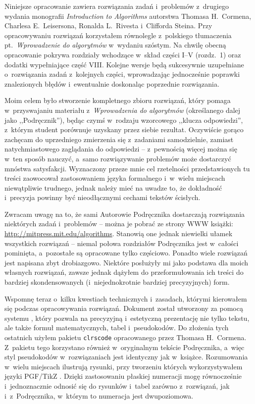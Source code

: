 
Niniejsze opracowanie zawiera rozwiązania zadań i~problemów z~drugiego wydania monografii \textsl{Introduction to Algorithms} \cite{cormen} autorstwa Thomasa H.\ Cormena, Charlesa E.\ Leisersona, Ronalda L.\ Rivesta i~Clifforda Steina.
Przy opracowywaniu rozwiązań korzystałem równolegle z~polskiego tłumaczenia pt.\ \textsl{Wprowadzenie do algorytmów} \cite{cormenpl} w~wydaniu szóstym.
Na chwilę obecną opracowanie pokrywa rozdziały wchodzące w~skład części I--V (rozdz.\ 1) oraz dodatki wypełniające część VIII\@.
Kolejne wersje będą sukcesywnie uzupełniane o~rozwiązania zadań z~kolejnych części, wprowadzając jednocześnie poprawki znalezionych błędów i~ewentualnie doskonaląc poprzednie rozwiązania.

Moim celem było stworzenie kompletnego zbioru rozwiązań, który pomaga w~przyswajaniu materiału z~\textsl{Wprowadzenia do algorytmów} (określanego dalej jako ,,Podręcznik''), będąc czymś w~rodzaju wzorcowego ,,klucza odpowiedzi'', z~którym student porównuje uzyskany przez siebie rezultat.
Oczywiście gorąco zachęcam do uprzedniego zmierzenia się z~zadaniami samodzielnie, zamiast natychmiastowego zaglądania do odpowiedzi -- z~pewnością więcej można się w~ten sposób nauczyć, a~samo rozwiązywanie problemów może dostarczyć mnóstwa satysfakcji.
Wyznaczony przeze mnie cel rzetelności przedstawionych tu treści zaowocował zastosowaniem języka formalnego i~w~wielu miejscach niewątpliwie trudnego, jednak należy mieć na uwadze to, że dokładność i~precyzja powinny być nieodłącznymi cechami tekstów ścisłych.

Zwracam uwagę na to, że sami Autorowie Podręcznika dostarczają rozwiązania niektórych zadań i~problemów -- można je pobrać ze strony WWW książki: \url{http://mitpress.mit.edu/algorithms}.
Stanowią one jednak niewielki ułamek wszystkich rozwiązań -- niemal połowa rozdziałów Podręcznika jest w~całości pominięta, a~pozostałe są opracowane tylko częściowo.
Ponadto wiele rozwiązań jest napisana zbyt drobiazgowo.
Niektóre posłużyły mi jako podstawa dla moich własnych rozwiązań, zawsze jednak dążyłem do przeformułowania ich treści do bardziej skondensowanych (i~niejednokrotnie bardziej precyzyjnych) form.

Wspomnę teraz o~kilku kwestiach technicznych i~zasadach, którymi kierowałem się podczas opracowywania rozwiązań.
Dokument został utworzony za pomocą systemu \LaTeXe, który pozwala na precyzyjną i~estetyczną prezentację nie tylko tekstu, ale także formuł matematycznych, tabel i~pseudokodów.
Do złożenia tych ostatnich użyłem pakietu \texttt{clrscode} opracowanego przez Thomasa H.\ Cormena.
Z~pakietu tego korzystano również w~oryginalnym tekście Podręcznika, a~więc styl pseudokodów w~rozwiązaniach jest identyczny jak w~książce.
Rozumowania w~wielu miejscach ilustrują rysunki, przy tworzeniu których wykorzystywałem języki PGF/TikZ \cite{pgfmanual}.
Dzięki zastosowaniu płaskiej numeracji mogę równocześnie i~jednoznacznie odnosić się do rysunków i~tabel zarówno z~rozwiązań, jak i~z~Podręcznika, w~którym to numeracja jest dwupoziomowa.

